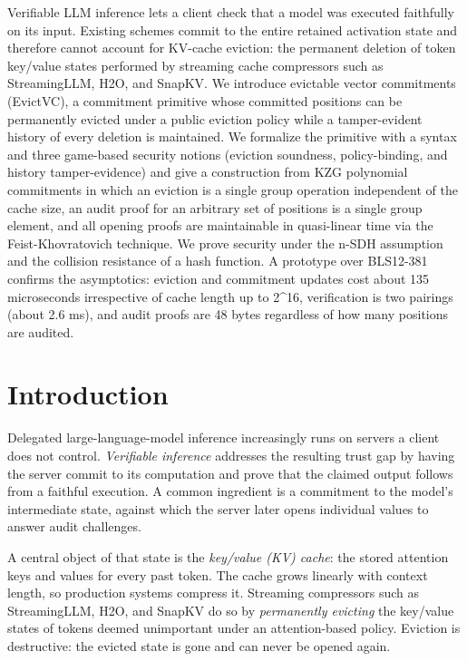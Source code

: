 \documentclass[version=submission]{iacrcc}
\theoremstyle{definition}
\begin{document}
\begin{textabstract}
Verifiable LLM inference lets a client check that a model was executed faithfully on its input. Existing schemes commit to the entire retained activation state and therefore cannot account for KV-cache eviction: the permanent deletion of token key/value states performed by streaming cache compressors such as StreamingLLM, H2O, and SnapKV. We introduce evictable vector commitments (EvictVC), a commitment primitive whose committed positions can be permanently evicted under a public eviction policy while a tamper-evident history of every deletion is maintained. We formalize the primitive with a syntax and three game-based security notions (eviction soundness, policy-binding, and history tamper-evidence) and give a construction from KZG polynomial commitments in which an eviction is a single group operation independent of the cache size, an audit proof for an arbitrary set of positions is a single group element, and all opening proofs are maintainable in quasi-linear time via the Feist-Khovratovich technique. We prove security under the n-SDH assumption and the collision resistance of a hash function. A prototype over BLS12-381 confirms the asymptotics: eviction and commitment updates cost about 135 microseconds irrespective of cache length up to 2^16, verification is two pairings (about 2.6 ms), and audit proofs are 48 bytes regardless of how many positions are audited.
\end{textabstract}

\section{Introduction}\label{sec:intro}

Delegated large-language-model inference increasingly runs on servers a client
does not control. \emph{Verifiable inference} addresses the resulting trust gap
by having the server commit to its computation and prove that the claimed output
follows from a faithful execution. A common ingredient is a commitment to the
model's intermediate state, against which the server later opens individual
values to answer audit challenges.

A central object of that state is the \emph{key/value (KV) cache}: the stored
attention keys and values for every past token. The cache grows linearly with
context length, so production systems compress it. Streaming compressors such as
StreamingLLM, H2O, and SnapKV do so by \emph{permanently evicting} the
key/value states of tokens deemed unimportant under an attention-based policy.
Eviction is destructive: the evicted state is gone and can never be opened
again.
\end{document}
